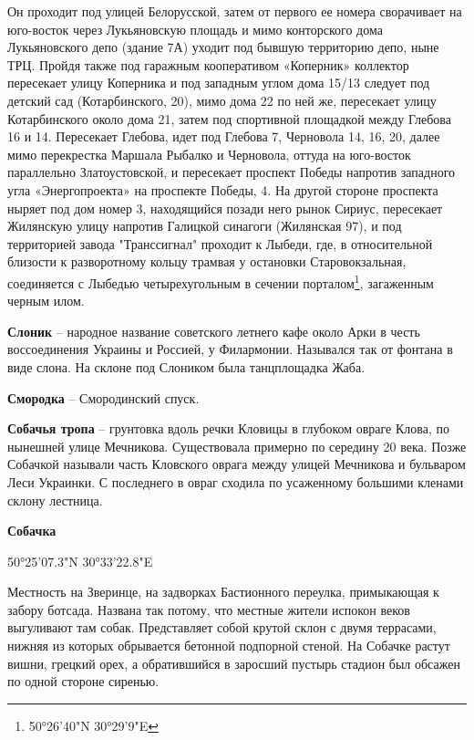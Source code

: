 Он проходит под улицей Белорусской, затем от первого ее номера сворачивает на юго-восток через Лукьяновскую площадь и мимо конторского дома Лукьяновского депо (здание 7А) уходит под бывшую территорию депо, ныне ТРЦ. Пройдя также под гаражным кооперативом «Коперник» коллектор пересекает улицу Коперника и под западным углом дома 15/13 следует под детский сад (Котарбинского, 20), мимо дома 22 по ней же, пересекает улицу Котарбинского около дома 21, затем под спортивной площадкой между Глебова 16 и 14. Пересекает Глебова, идет под Глебова 7, Черновола 14, 16, 20, далее мимо перекрестка Маршала Рыбалко и Черновола, оттуда на юго-восток параллельно Златоустовской, и пересекает проспект Победы напротив западного угла «Энергопроекта» на проспекте Победы, 4. На другой стороне проспекта ныряет под дом номер 3, находящийся позади него рынок Сириус, пересекает Жилянскую улицу напротив Галицкой синагоги (Жилянская 97), и под территорией завода "Транссигнал" проходит к Лыбеди, где, в относительной близости к разворотному кольцу трамвая у остановки Старовокзальная, соединяется с Лыбедью четырехугольным в сечении порталом\footnote{50°26'40"N 30°29'9"E}, загаженным черным илом.\\

\medskip

\textbf{Слоник} – народное название советского летнего кафе около Арки в честь воссоединения Украины и Россией, у Филармонии. Назывался так от фонтана в виде слона. На склоне под Слоником была танцплощадка Жаба.\\

\medskip


\textbf{Смородка} – Смородинский спуск.\\

\medskip

\textbf{Собачья тропа} – грунтовка вдоль речки Кловицы в глубоком овраге Клова, по нынешней улице Мечникова. Существовала примерно по середину 20 века. Позже Собачкой называли часть Кловского оврага между улицей Мечникова и бульваром Леси Украинки. С последнего в овраг сходила по усаженному большими кленами склону лестница.\\

\medskip

\textbf{Собачка} 

50°25'07.3"N 30°33'22.8"E

Местность на Зверинце, на задворках Бастионного переулка, примыкающая к забору ботсада. Названа так потому, что местные жители испокон веков выгуливают там собак. Представляет собой крутой склон с двумя террасами, нижняя из которых обрывается бетонной подпорной стеной. На Собачке растут вишни, грецкий орех, а обратившийся в заросший пустырь стадион был обсажен по одной стороне сиренью.

